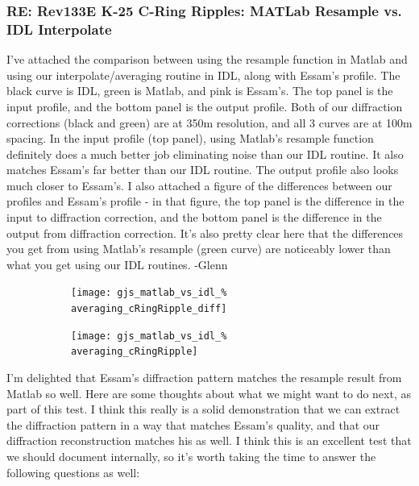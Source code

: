 \documentclass[crop=false,class=article,oneside]{standalone}
\begin{document}
\subsubsection{\footnotesize RE: Rev133E K-25 C-Ring Ripples: MATLab Resample vs. IDL Interpolate}
I've attached the comparison between using the resample function in Matlab and using our interpolate/averaging routine in IDL, along with Essam's profile. The black curve is IDL, green is Matlab, and pink is Essam's. The top panel is the input profile, and the bottom panel is the output profile. Both of our diffraction corrections (black and green) are at 350m resolution, and all 3 curves are at 100m spacing. In the input profile (top panel), using Matlab's resample function definitely does a much better job eliminating noise than our IDL routine. It also matches Essam's far better than our IDL routine. The output profile also looks much closer to Essam's. I also attached a figure of the differences between our profiles and Essam’s profile - in that figure, the top panel is the difference in the input to diffraction correction, and the bottom panel is the difference in the output from diffraction correction. It’s also pretty clear here that the differences you get from using Matlab’s resample (green curve) are noticeably lower than what you get using our IDL routines. -Glenn
\begin{figure}[H]
    \centering
    \captionsetup{type=figure}
    \captionsetup{type=figure}
    \begin{subfigure}[b]{0.49\textwidth}
        \captionsetup{type=figure}
        \texttt{[image: gjs\_matlab\_vs\_idl\_\%
                                           averaging\_cRingRipple\_diff]}
    \end{subfigure}
    \begin{subfigure}[b]{0.49\textwidth}
        \captionsetup{type=figure}
        \texttt{[image: gjs\_matlab\_vs\_idl\_\%
                                           averaging\_cRingRipple]}
    \end{subfigure}
\end{figure}
I'm delighted that Essam's diffraction pattern matches the resample result from Matlab so well. Here are some thoughts about what we might want to do next, as part of this test. I think this really is a solid demonstration that we can extract the diffraction pattern in a way that matches Essam's quality, and that our diffraction reconstruction matches his as well. I think this is an excellent test that we should document internally, so it's worth taking the time to answer the following questions as well:
\end{document}
